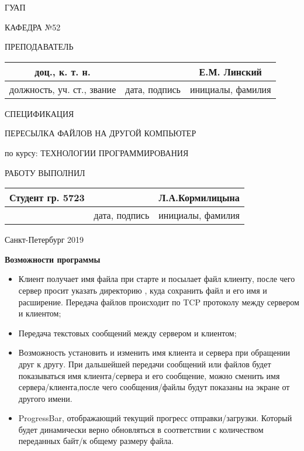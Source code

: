 \documentclass[12pt,a4paper]{article}
\begin{document}
\thispagestyle{empty}
\begin{center}
ГУАП

КАФЕДРА №52
\end{center}

\vspace{30mm}
ПРЕПОДАВАТЕЛЬ

\begin{tabular}{ |c|c|c| }
\hline
доц., к. т. н. & & Е.М. Линский \\\hline
должность, уч. ст., звание & дата, подпись & инициалы, фамилия \\\hline
\end{tabular}

\vspace{30mm}
\begin{center}
СПЕЦИФИКАЦИЯ

ПЕРЕСЫЛКА ФАЙЛОВ НА ДРУГОЙ КОМПЬЮТЕР
\end{center}

\vspace{10mm}
по курсу: ТЕХНОЛОГИИ ПРОГРАММИРОВАНИЯ

\vspace{50mm}
\hspace{8mm}РАБОТУ ВЫПОЛНИЛ
\begin{center}
\begin{tabular}{ |c|c|c| }
\hline
Студент гр. 5723 & & Л.А.Кормилицына \\\hline
& дата, подпись & инициалы, фамилия \\
\hline
\end{tabular}
\vspace{15mm}

Санкт-Петербург 2019
\end{center}

\newpage
\begin{center}
\Large{\bf Возможности программы}
\end{center}
\setcounter{page}{2}

\begin{itemize}
\item Клиент получает имя файла при старте и посылает файл клиенту, после чего сервер просит указать директорию , куда сохранить файл и его имя и расширение. Передача файлов происходит по TCP протоколу между сервером и клиентом;
\item Передача текстовых сообщений между сервером и клиентом;
\item Возможность установить и изменить имя клиента и сервера при обращении друг к другу. При дальшейшей передачи сообщений или файлов будет показываться имя клиента/сервера и его сообщение, можно сменить имя сервера/клиента,после чего сообщения/файлы будут показаны на экране от другого имени. 
\item ProgressBar, отображающий текущий прогресс отправки/загрузки.
Который будет динамически верно обновляться в соответствии с количеством переданных байт/к общему размеру файла.

\end{itemize}
\newpage
\end{document}
